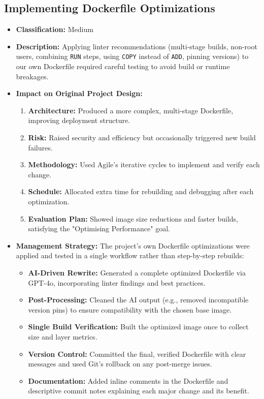 \subsection{Implementing Dockerfile Optimizations}
\label{subsec:optimization_difficulty}
\begin{itemize}
    \item \textbf{Classification:} Medium
    \item \textbf{Description:} Applying linter recommendations (multi-stage builds, non-root users, combining \texttt{RUN} steps, using \texttt{COPY} instead of \texttt{ADD}, pinning versions) to our own Dockerfile required careful testing to avoid build or runtime breakages.
    \item \textbf{Impact on Original Project Design:}
        \begin{enumerate}
            \item \textbf{Architecture:} Produced a more complex, multi-stage Dockerfile, improving deployment structure.
            \item \textbf{Risk:} Raised security and efficiency but occasionally triggered new build failures.
            \item \textbf{Methodology:} Used Agile's iterative cycles to implement and verify each change.
            \item \textbf{Schedule:} Allocated extra time for rebuilding and debugging after each optimization.
            \item \textbf{Evaluation Plan:} Showed image size reductions and faster builds, satisfying the "Optimising Performance" goal.
        \end{enumerate}
    \item \textbf{Management Strategy:} The project's own Dockerfile optimizations were applied and tested in a single workflow rather than step-by-step rebuilds:
        \begin{itemize}
            \item \textbf{AI-Driven Rewrite:} Generated a complete optimized Dockerfile via GPT-4o, incorporating linter findings and best practices.
            \item \textbf{Post-Processing:} Cleaned the AI output (e.g., removed incompatible version pins) to ensure compatibility with the chosen base image.
            \item \textbf{Single Build Verification:} Built the optimized image once to collect size and layer metrics.
            \item \textbf{Version Control:} Committed the final, verified Dockerfile with clear messages and used Git's rollback on any post-merge issues.
            \item \textbf{Documentation:} Added inline comments in the Dockerfile and descriptive commit notes explaining each major change and its benefit.
        \end{itemize}
\end{itemize}

